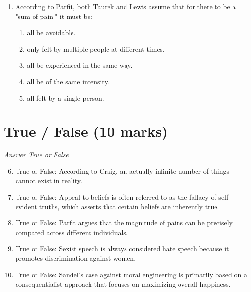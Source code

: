 \documentclass[12pt]{article}
\begin{document}
\begin{enumerate}[label=\arabic*.]
\begin{enumerate}[label=(\alph*)]
    \item Papadaki argues that sexual objectification is an outdated concept.
    \item sexual objectification actually enhances humanity.
    \item Papadaki believes that sexual objectification is a necessary part of human relationships.
\end{enumerate}
\item According to Parfit, both Taurek and Lewis assume that for there to be a "sum of pain," it must be:
\begin{enumerate}[label=(\alph*)]
    \item all be avoidable.
    \item only felt by multiple people at different times.
    \item all be experienced in the same way.
    \item all be of the same intensity.
    \item all felt by a single person.
\end{enumerate}
\end{enumerate}

\section*{True / False (10 marks)}
\textit{Answer True or False}
\begin{enumerate}[label=\arabic*.]
\setcounter{enumi}{5}
\item True or False: According to Craig, an actually infinite number of things cannot exist in reality.
\item True or False: Appeal to beliefs is often referred to as the fallacy of self-evident truths, which asserts that certain beliefs are inherently true.
\item True or False: Parfit argues that the magnitude of pains can be precisely compared across different individuals.
\item True or False: Sexist speech is always considered hate speech because it promotes discrimination against women.
\item True or False: Sandel's case against moral engineering is primarily based on a consequentialist approach that focuses on maximizing overall happiness.
\end{enumerate}
\end{document}
